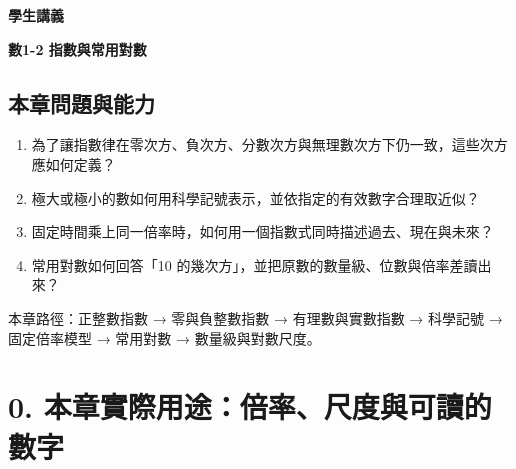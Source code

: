 \documentclass[11pt,a4paper]{article}
\providecommand{\tightlist}{%
  \setlength{\itemsep}{0pt}\setlength{\parskip}{0pt}}
\begin{document}
\begin{tcolorbox}[
  enhanced,colback=white,colframe=HandoutBlue,boxrule=1.1pt,arc=2mm,
  borderline west={3pt}{0pt}{HandoutBlue},left=5mm,right=4mm,top=4mm,bottom=4mm
]
{\sffamily\small\bfseries\color{HandoutBlue}學生講義}\par
{\sffamily\bfseries\LARGE\color{HandoutInk}數1-2 指數與常用對數}\par
\vspace{0.35em}{\large 用固定倍率描述跨尺度的數量，並以常用對數判讀數量級}\par
{}\par
{}\par
\end{tcolorbox}


\begin{HandoutLearningMap}

\subsection{本章問題與能力}\label{ux672cux7ae0ux554fux984cux8207ux80fdux529b}

\begin{enumerate}
\def\labelenumi{\arabic{enumi}.}
\tightlist
\item
  為了讓指數律在零次方、負次方、分數次方與無理數次方下仍一致，這些次方應如何定義？
\item
  極大或極小的數如何用科學記號表示，並依指定的有效數字合理取近似？
\item
  固定時間乘上同一倍率時，如何用一個指數式同時描述過去、現在與未來？
\item
  常用對數如何回答「10 的幾次方」，並把原數的數量級、位數與倍率差讀出來？
\end{enumerate}

本章路徑：正整數指數 → 零與負整數指數 → 有理數與實數指數 → 科學記號 → 固定倍率模型 → 常用對數 → 數量級與對數尺度。

\end{HandoutLearningMap}

\section{0. 本章實際用途：倍率、尺度與可讀的數字}\label{ux672cux7ae0ux5be6ux969bux7528ux9014ux500dux7387ux5c3aux5ea6ux8207ux53efux8b80ux7684ux6578ux5b57}
\end{document}
